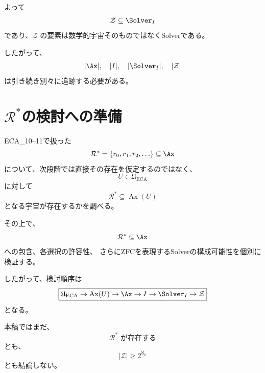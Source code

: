 \documentclass[11pt,a4paper]{article}
\begin{document}
よって
\[
\mathcal Z\subseteq\Solver_I
\]
であり、\(\mathcal Z\) の要素は数学的宇宙そのものではなくSolverである。

したがって、
\[
|\Ax|,\quad |I|,\quad|\Solver_I|,\quad|\mathcal Z|
\]
は引き続き別々に追跡する必要がある。

\section{\(\mathcal R^*\)の検討への準備}
ECA\_10--11で扱った
\[
\mathcal R^*=\{r_0,r_1,r_2,\ldots\}\subseteq\Ax
\]
について、次段階では直接その存在を仮定するのではなく、
\[
U\in\mathfrak U_{\mathrm{ECA}}
\]
に対して
\[
\mathcal R^*\subseteq\operatorname{Ax}(U)
\]
となる宇宙が存在するかを調べる。

その上で、
\[
\mathcal R^*\subseteq\Ax
\]
への包含、各選択の許容性、
さらにZFCを表現するSolverの構成可能性を個別に検証する。

したがって、検討順序は
\[
\boxed{
\mathfrak U_{\mathrm{ECA}}
\rightarrow
\operatorname{Ax}(U)
\rightarrow
\Ax
\rightarrow
I
\rightarrow
\Solver_I
\rightarrow
\mathcal Z
}
\]
となる。

本稿ではまだ、
\[
\mathcal R^*\text{ が存在する}
\]
とも、
\[
|\mathcal Z|\ge2^{\aleph_0}
\]
とも結論しない。
\end{document}

